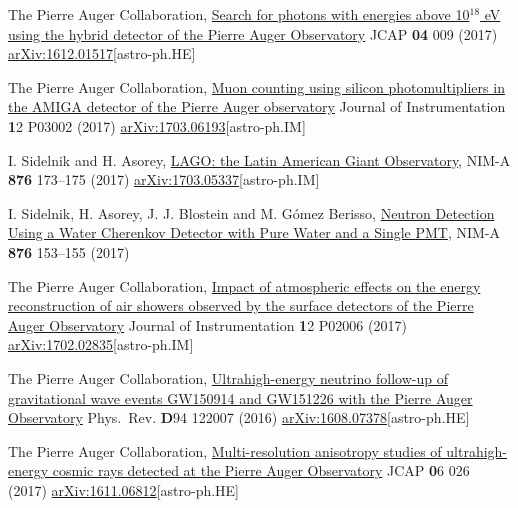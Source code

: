 \begin{etaremune}
\item {}The Pierre Auger Collaboration, \href{https://doi.org/10.1088/1475-7516/2017/04/009}{{Search for photons with energies above 10$^{18}$ eV using the hybrid detector of the Pierre Auger Observatory}} JCAP {\textbf{04}} 009 (2017) \href{http://arxiv.org/abs/1612.01517}{arXiv:1612.01517}[astro-ph.HE]

\item {}The Pierre Auger Collaboration, \href{https://doi.org/10.1088/1748-0221/12/03/P03002}{{Muon counting using silicon photomultipliers in the AMIGA detector of the Pierre Auger observatory}} Journal of Instrumentation {\textbf 12} P03002 (2017) \href{http://arxiv.org/abs/1703.06193}{arXiv:1703.06193}[astro-ph.IM]

\item {}I. Sidelnik and H. Asorey, \href{https://doi.org/10.1016/j.nima.2017.02.069}{{LAGO: the Latin American Giant Observatory}}, NIM-A {\textbf{876}} 173--175 (2017) \href{http://arxiv.org/abs/1703.05337}{arXiv:1703.05337}[astro-ph.IM]

\item {} I. Sidelnik, H. Asorey, J. J. Blostein and M. Gómez Berisso, \href{https://doi.org/10.1016/j.nima.2017.02.048}{{Neutron Detection Using a Water Cherenkov Detector with Pure Water and a Single PMT}}, NIM-A {\textbf{876}} 153--155 (2017)

\item {}The Pierre Auger Collaboration, \href{https://doi.org/10.1088/1748-0221/12/02/P02006}{{Impact of atmospheric effects on the energy reconstruction of air showers observed by the surface detectors of the Pierre Auger Observatory}} Journal of Instrumentation {\textbf 12} P02006 (2017) \href{http://arxiv.org/abs/1702.02835}{arXiv:1702.02835}[astro-ph.IM]

\item {}The Pierre Auger Collaboration, \href{https://doi.org/10.1103/PhysRevD.94.122007}{{Ultrahigh-energy neutrino follow-up of gravitational wave events GW150914 and GW151226 with the Pierre Auger Observatory}} Phys.\ Rev. {\textbf D94} 122007 (2016) \href{http://arxiv.org/abs/1608.07378}{arXiv:1608.07378}[astro-ph.HE]

\item {}The Pierre Auger Collaboration, \href{https://doi.org/10.1088/1475-7516/2017/06/026}{{Multi-resolution anisotropy studies of ultrahigh-energy cosmic rays detected at the Pierre Auger Observatory}} JCAP {\textbf 06} 026 (2017) \href{http://arxiv.org/abs/1611.06812}{arXiv:1611.06812}[astro-ph.HE]


\end{etaremune}
